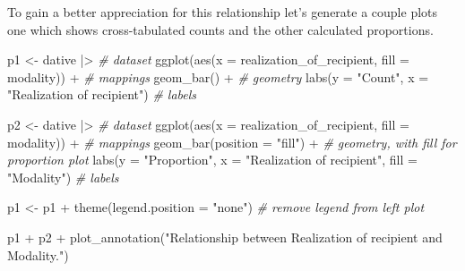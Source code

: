 \documentclass[
  letterpaper,
]{latex/krantz}
\newenvironment{Shaded}{\begin{snugshade}}{\end{snugshade}}
\newcommand{\AttributeTok}[1]{\textcolor[rgb]{0.00,0.00,0.00}{#1}}
\newcommand{\CommentTok}[1]{\textcolor[rgb]{0.00,0.00,0.00}{\textit{#1}}}
\newcommand{\FunctionTok}[1]{\textcolor[rgb]{0.00,0.00,0.00}{#1}}
\newcommand{\NormalTok}[1]{\textcolor[rgb]{0.00,0.00,0.00}{#1}}
\newcommand{\OtherTok}[1]{\textcolor[rgb]{0.00,0.00,0.00}{#1}}
\newcommand{\SpecialCharTok}[1]{\textcolor[rgb]{0.00,0.00,0.00}{#1}}
\newcommand{\StringTok}[1]{\textcolor[rgb]{0.00,0.00,0.00}{#1}}
\begin{document}
To gain a better appreciation for this relationship let's generate a
couple plots one which shows cross-tabulated counts and the other
calculated proportions.

\begin{Shaded}
\begin{Highlighting}[]
\NormalTok{p1 }\OtherTok{\textless{}{-}} 
\NormalTok{  dative }\SpecialCharTok{|\textgreater{}} \CommentTok{\# dataset}
  \FunctionTok{ggplot}\NormalTok{(}\FunctionTok{aes}\NormalTok{(}\AttributeTok{x =}\NormalTok{ realization\_of\_recipient, }\AttributeTok{fill =}\NormalTok{ modality)) }\SpecialCharTok{+} \CommentTok{\# mappings}
  \FunctionTok{geom\_bar}\NormalTok{() }\SpecialCharTok{+} \CommentTok{\# geometry}
  \FunctionTok{labs}\NormalTok{(}\AttributeTok{y =} \StringTok{"Count"}\NormalTok{, }\AttributeTok{x =} \StringTok{"Realization of recipient"}\NormalTok{) }\CommentTok{\# labels}

\NormalTok{p2 }\OtherTok{\textless{}{-}} 
\NormalTok{  dative }\SpecialCharTok{|\textgreater{}} \CommentTok{\# dataset}
  \FunctionTok{ggplot}\NormalTok{(}\FunctionTok{aes}\NormalTok{(}\AttributeTok{x =}\NormalTok{ realization\_of\_recipient, }\AttributeTok{fill =}\NormalTok{ modality)) }\SpecialCharTok{+} \CommentTok{\# mappings}
  \FunctionTok{geom\_bar}\NormalTok{(}\AttributeTok{position =} \StringTok{"fill"}\NormalTok{) }\SpecialCharTok{+} \CommentTok{\# geometry, with fill for proportion plot}
  \FunctionTok{labs}\NormalTok{(}\AttributeTok{y =} \StringTok{"Proportion"}\NormalTok{, }\AttributeTok{x =} \StringTok{"Realization of recipient"}\NormalTok{, }\AttributeTok{fill =} \StringTok{"Modality"}\NormalTok{) }\CommentTok{\# labels}

\NormalTok{p1 }\OtherTok{\textless{}{-}}\NormalTok{ p1 }\SpecialCharTok{+} \FunctionTok{theme}\NormalTok{(}\AttributeTok{legend.position =} \StringTok{"none"}\NormalTok{) }\CommentTok{\# remove legend from left plot}

\NormalTok{p1 }\SpecialCharTok{+}\NormalTok{ p2 }\SpecialCharTok{+} \FunctionTok{plot\_annotation}\NormalTok{(}\StringTok{"Relationship between Realization of recipient and Modality."}\NormalTok{)}
\end{Highlighting}
\end{Shaded}
\end{document}
